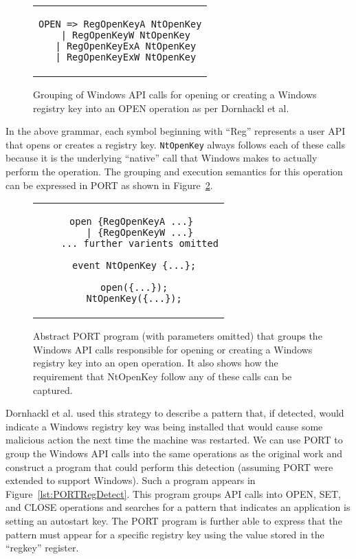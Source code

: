 \begin{figure}[H]
\centering
\begin{tabular}{c}
\begin{lstlisting}
OPEN => RegOpenKeyA NtOpenKey
  | RegOpenKeyW NtOpenKey
  | RegOpenKeyExA NtOpenKey
  | RegOpenKeyExW NtOpenKey
\end{lstlisting}
\end{tabular}
\caption{Grouping of Windows API calls for opening or creating a Windows
  registry key into an OPEN operation as per Dornhackl et al.}
\label{lst:DornhacklOpen}
\end{figure}


In the above grammar, each symbol beginning with ``Reg'' represents a user
API that opens or creates a registry key.  {\tt NtOpenKey} always follows
each of these calls because it is the underlying ``native'' call that
Windows makes to actually perform the operation.
The grouping and execution semantics for this operation can be expressed
in PORT as shown in Figure~\ref{lst:PORTOpenReg}.


\begin{figure}[H]
\centering
\begin{tabular}{c}
\begin{lstlisting}
 open {RegOpenKeyA ...}
    | {RegOpenKeyW ...}
    ... further varients omitted

  event NtOpenKey {...};

  open({...});
  NtOpenKey({...});
\end{lstlisting}
\end{tabular}
  \caption{Abstract PORT program (with parameters
  omitted) that groups the Windows API calls responsible for opening or
  creating a Windows registry key into an open operation.  It also shows
  how the requirement that NtOpenKey follow any of these calls can be
  captured.}
\label{lst:PORTOpenReg}
\end{figure}

Dornhackl et al. used this strategy to describe a pattern that, if
detected, would indicate
a Windows registry key was being installed
that would cause some malicious action
the next time the machine was restarted.  We can use PORT to group the
Windows API calls into the same operations as the original work and
construct a program that could perform this detection (assuming PORT were
extended to support Windows).  Such a program appears in
Figure~\ref{lst:PORTRegDetect}.  This program groups API calls into OPEN,
SET, and CLOSE operations and searches for a pattern that
indicates
an application is
setting an autostart key.  The PORT program is further able to express
that the pattern must appear for a specific registry key using the value
stored in the ``regkey'' register.


